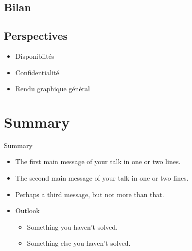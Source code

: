 \documentclass{beamer}
\begin{document}
\subsection{Bilan}



\subsection{Perspectives}
\begin{frame}
  \begin{itemize}
      \item{Disponibiltés}
      \item{Confidentialité}
      \item{Rendu graphique général}
  \end{itemize}
\end{frame}

\section*{Summary}

\begin{frame}{Summary}
  \begin{itemize}
  \item
    The \alert{first main message} of your talk in one or two lines.
  \item
    The \alert{second main message} of your talk in one or two lines.
  \item
    Perhaps a \alert{third message}, but not more than that.
  \end{itemize}
  
  \begin{itemize}
  \item
    Outlook
    \begin{itemize}
    \item
      Something you haven't solved.
    \item
      Something else you haven't solved.
    \end{itemize}
  \end{itemize}
\end{frame}



\appendix
\end{document}
